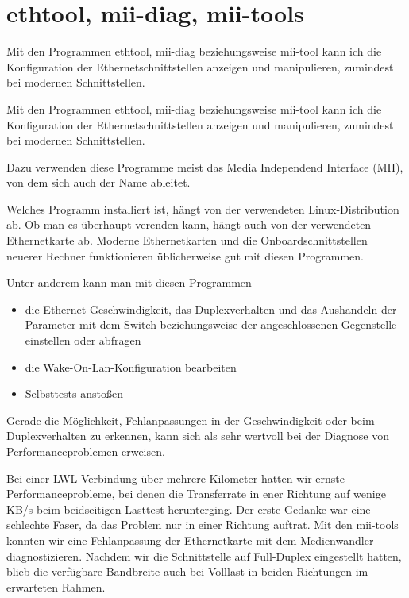 \section{ethtool, mii-diag, mii-tools}
\label{sec:netz-werkzeuge-ethtool}
\begin{abstractsec}
  Mit den Programmen ethtool, mii-diag beziehungsweise mii-tool kann ich die
  Konfiguration der Ethernetschnittstellen anzeigen und manipulieren,
  zumindest bei modernen Schnittstellen.
\end{abstractsec}
\begin{normaltext}
  Mit den Programmen ethtool, mii-diag beziehungsweise mii-tool kann ich die
  Konfiguration der Ethernetschnittstellen anzeigen und manipulieren,
  zumindest bei modernen Schnittstellen.

  Dazu verwenden diese Programme meist das Media Independend Interface (MII),
  von dem sich auch der Name ableitet.

  Welches Programm installiert ist, hängt von der verwendeten
  Linux-Distribution ab. Ob man es überhaupt verenden kann, hängt auch von der
  verwendeten Ethernetkarte ab. Moderne Ethernetkarten und die
  Onboardschnittstellen neuerer Rechner funktionieren üblicherweise gut mit
  diesen Programmen.

  Unter anderem kann man mit diesen Programmen
  \begin{itemize}
    \item die Ethernet-Geschwindigkeit, das Duplexverhalten und das Aushandeln
      der Parameter mit dem Switch beziehungsweise der angeschlossenen
      Gegenstelle einstellen oder abfragen
    \item die Wake-On-Lan-Konfiguration bearbeiten
    \item Selbsttests anstoßen
  \end{itemize}

  Gerade die Möglichkeit, Fehlanpassungen in der Geschwindigkeit oder beim
  Duplexverhalten zu erkennen, kann sich als sehr wertvoll bei der Diagnose
  von Performanceproblemen erweisen.

  Bei einer LWL-Verbindung über mehrere Kilometer hatten wir ernste
  Performanceprobleme, bei denen die Transferrate in ener Richtung auf wenige
  KB/s beim beidseitigen Lasttest herunterging. Der erste Gedanke war eine
  schlechte Faser, da das Problem nur in einer Richtung auftrat. Mit den
  mii-tools konnten wir eine Fehlanpassung der Ethernetkarte mit dem
  Medienwandler diagnostizieren. Nachdem wir die Schnittstelle auf Full-Duplex
  eingestellt hatten, blieb die verfügbare Bandbreite auch bei Volllast in
  beiden Richtungen im erwarteten Rahmen.
\end{normaltext}


